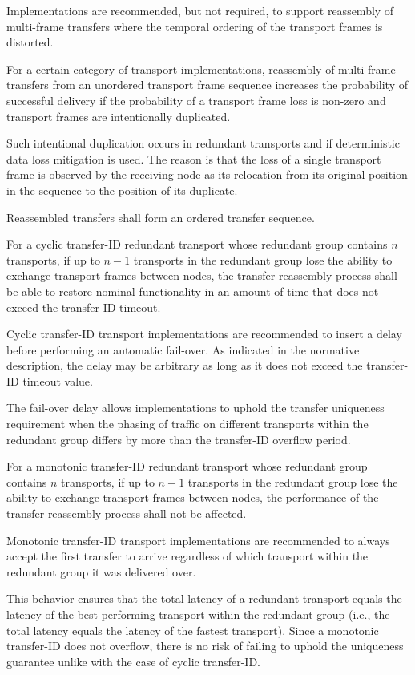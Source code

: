 Implementations are recommended, but not required, to support reassembly of
multi-frame transfers where the temporal ordering of the transport frames is distorted.

\begin{remark}
    For a certain category of transport implementations, reassembly of multi-frame transfers from an
    unordered transport frame sequence increases the probability of successful delivery if
    the probability of a transport frame loss is non-zero and transport frames are intentionally duplicated.

    Such intentional duplication occurs in redundant transports and if deterministic data loss mitigation is used.
    The reason is that the loss of a single transport frame is observed by the receiving node as its relocation
    from its original position in the sequence to the position of its duplicate.
\end{remark}

Reassembled transfers shall form an ordered transfer sequence.

For a cyclic transfer-ID redundant transport whose redundant group contains $n$ transports,
if up to $n-1$ transports in the redundant group lose the ability to exchange transport frames between nodes,
the transfer reassembly process shall be able to restore nominal functionality
in an amount of time that does not exceed the transfer-ID timeout.

\begin{remark}
    Cyclic transfer-ID transport implementations are recommended to insert a delay before performing
    an automatic fail-over.
    As indicated in the normative description, the delay may be arbitrary as long as it does not exceed the
    transfer-ID timeout value.

    The fail-over delay allows implementations to uphold the transfer uniqueness requirement when the phasing of
    traffic on different transports within the redundant group differs by more than the transfer-ID overflow period.
\end{remark}

For a monotonic transfer-ID redundant transport whose redundant group contains $n$ transports,
if up to $n-1$ transports in the redundant group lose the ability to exchange transport frames between nodes,
the performance of the transfer reassembly process shall not be affected.

\begin{remark}
    Monotonic transfer-ID transport implementations are recommended to always accept the first transfer
    to arrive regardless of which transport within the redundant group it was delivered over.

    This behavior ensures that the total latency of a redundant transport equals the latency of the best-performing
    transport within the redundant group (i.e., the total latency equals the latency of the fastest transport).
    Since a monotonic transfer-ID does not overflow, there is no risk of failing to uphold the uniqueness guarantee
    unlike with the case of cyclic transfer-ID.
\end{remark}

